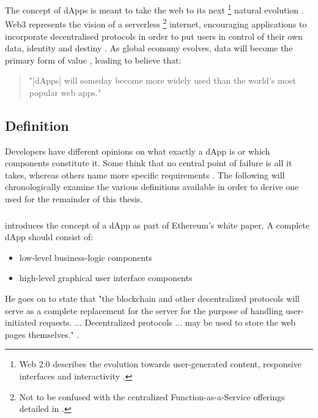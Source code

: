 The concept of \acp{dApp} is meant to take the web to its next \footnote{Web 2.0 describes the evolution towards user-generated content, responsive interfaces and interactivity \cite[p.~34]{Antonopoulos.2018}.} natural evolution \cite[pp.~34]{Antonopoulos.2018}. Web3 represents the vision of a serverless \footnote{Not to be confused with the centralized Function-as-a-Service offerings detailed in \cite{serverlessComputing}.} internet, encouraging applications to incorporate decentralised protocols in order to put users in control of their own data, identity and destiny \cite{web3}. As global economy evolves, data will become the primary form of value \cite[p.~25]{Raval.2016}, leading \citeauthor{Raval.2016} to believe that:

\begin{quote}
  "[\acp{dApp}] will someday become more widely used than the world's most popular web apps." \cite[p.~5]{Raval.2016}
\end{quote}

\subsection{Definition}
Developers have different opinions on what exactly a \ac{dApp} is or which components constitute it. Some think that no central point of failure is all it takes, whereas others name more specific requirements \cite[p.~9]{Raval.2016}. The following will chronologically examine the various definitions available in order to derive one used for the remainder of this thesis. 

\subsubsection{\citeyear{EthereumWhitepaper}}
\citeauthor{EthereumWhitepaper} introduces the concept of a \ac{dApp} as part of Ethereum's white paper. A complete \ac{dApp} should consist of:

\begin{itemize}
  \item low-level business-logic components
  \item high-level graphical user interface components
\end{itemize}

He goes on to state that "the blockchain and other decentralized protocols will serve as a complete replacement for the server for the purpose of handling user-initiated requests. ... Decentralized protocols ... may be used to store the web pages themselves." \cite[p.~34]{EthereumWhitepaper}. 


